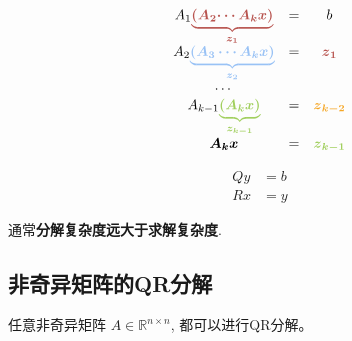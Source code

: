 \begin{example}[求解$k$个线性方程组 $ A_{1} A_{2} \cdots A_{k} x=b $]
    \begin{equation}\displaystyle \begin{matrix}
        A_{1}\textcolor[rgb]{0.72,0.33,0.31}{\boldsymbol{\underbrace{\boldsymbol{\textcolor[rgb]{0.72,0.33,0.31}{(}\textcolor[rgb]{0.72,0.33,0.31}{A}\textcolor[rgb]{0.72,0.33,0.31}{_{2}}\textcolor[rgb]{0.72,0.33,0.31}{\cdots A}\textcolor[rgb]{0.72,0.33,0.31}{_{k}}\textcolor[rgb]{0.72,0.33,0.31}{x}\textcolor[rgb]{0.72,0.33,0.31}{)}}}_{z_{1}}}} & = & b\\
        \textcolor[rgb]{0,0,0}{A}\textcolor[rgb]{0,0,0}{_{2}}\textcolor[rgb]{0.6,0.76,0.96}{\underbrace{\boldsymbol{( A_{3} \cdots A_{k} x)}}_{\boldsymbol{z_{2}}}} & = & \boldsymbol{\textcolor[rgb]{0.72,0.33,0.31}{z}\textcolor[rgb]{0.72,0.33,0.31}{_{1}}}\\
        \cdots  &  & \\
        A_{k-1}\textcolor[rgb]{0.63,0.81,0.37}{\boldsymbol{\underbrace{(\textcolor[rgb]{0.63,0.81,0.37}{A}\textcolor[rgb]{0.63,0.81,0.37}{_{k}}\textcolor[rgb]{0.63,0.81,0.37}{x}\textcolor[rgb]{0.63,0.81,0.37}{)}}_{z_{k-1}}}} & = & \boldsymbol{\textcolor[rgb]{0.96,0.65,0.14}{z}\textcolor[rgb]{0.96,0.65,0.14}{_{k-2}}}\\
        \boldsymbol{A_{k} x} & = & \boldsymbol{\textcolor[rgb]{0.63,0.81,0.37}{z}\textcolor[rgb]{0.63,0.81,0.37}{_{k-1}}}
        \end{matrix}\end{equation}
\end{example}

\begin{example}[QR分解$Ax = b$]
    \begin{equation}
\begin{aligned}
    Q y&=b\\
    R x&=y
\end{aligned}
\end{equation}
\end{example}

通常\textbf{分解复杂度远大于求解复杂度}.

\subsection{非奇异矩阵的QR分解}

\begin{theorem}
    任意非奇异矩阵 $ A \in \mathbb{R}^{n \times n} $, 都可以进行QR分解。
\end{theorem}


